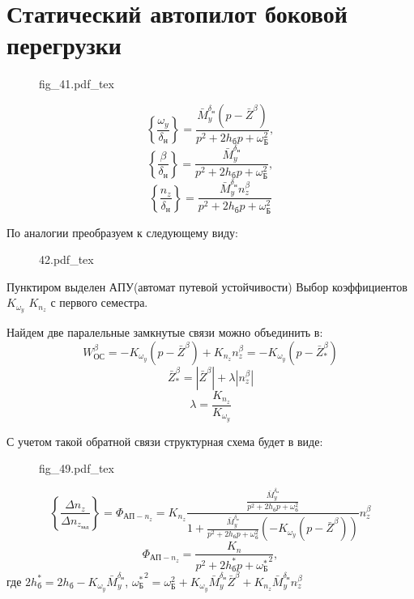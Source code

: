 \documentclass{article}
\newcommand{\incfig}[1]{
    {#1.pdf_tex}
}
\begin{document}
\section{Статический автопилот боковой перегрузки}

\begin{figure}[H]
    \centering
    {fig_41.pdf_tex}
\end{figure}



\[
    \left\{\frac{\omega_y}{\delta_н}\right\} = \frac{\bar{M}_y^{\delta_н}(p - \bar{Z}^\beta)}{ p^2 + 2 h_бp + \omega_Б^2 },
\]
\[
\left\{ \frac{\beta}{\delta_н} \right\} = \frac{ \bar{M}_y^{\delta_н} }{ p^2 + 2 h_бp + \omega_Б^2 }    
,\]  
\[
    \left\{ \frac{n_z}{\delta_н} \right\} = \frac{ \bar{M}_y^{\delta_н} n_z^\beta }{ p^2 + 2 h_бp + \omega_Б^2 }    
\]  

По аналогии преобразуем к следующему виду:

\begin{figure}[H]
    \centering
    {42.pdf_tex}
\end{figure}


Пунктиром выделен АПУ(автомат путевой устойчивости) 
Выбор коэффициентов $K_{\omega_y}$ $K_{n_z}$ с первого семестра.

Найдем две паралельные замкнутые связи можно объединить в: 
\[
W_{ОС}^\beta = - K_{\omega_y} (p - \bar{Z}^\beta) + K_{n_z} n_z^\beta = - K_{\omega_y}(p - \bar{Z}_*^\beta)
\]
\[
\bar{Z}_*^\beta = |\bar{Z}^\beta| + \lambda |n_z^\beta|
\]
\[
    \lambda = \frac{K_{n_z}}{K_{\omega_y}} 
\]

С учетом такой обратной связи структурная схема будет в виде:

\begin{figure}[ht]
    \centering
    \incfig{fig_49}
    \label{fig:fig_49}
\end{figure}

\[
\left\{\frac{\Delta n_z}{\Delta n_{z_{зад}}} \right\}  = \Phi_{АП-n_z} = K_{n_z}\frac{\frac{\bar{M}_y^{\delta_н}}{p^2 + 2 h_б p + \omega_б^2}}{1 +\frac{\bar{M}_y^{\delta_н}}{p^2 + 2 h_б p + \omega_б^2} (-K_{\omega_y}(p - \bar{Z}^\beta))}n_z^\beta  
\]
\[
\Phi_{АП-n_z} =\frac{K_n}{ p^2 + 2 h_б^*p + {\omega_Б^*}^2  }, 
\]
где $2h_б^* = 2h_б - K_{\omega_y}\bar{M}_y^{\delta_н}$, ${\omega_Б^*}^2 = \omega_Б^2 + K_{\omega_y}\bar{M}_y^{\delta_н} \bar{Z}^\beta + K_{n_z} \bar{M}_y^{\delta_н} n_z^\beta $
\end{document}
